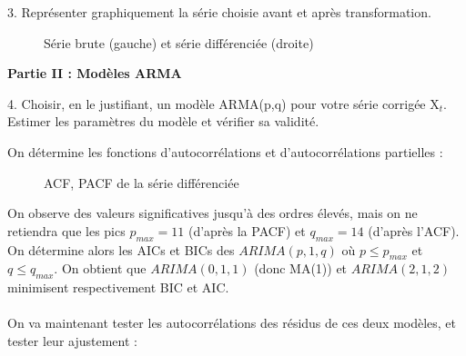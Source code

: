 \documentclass[a4paper, 12pt]{article} %
\begin{document}
\begin{tcolorbox}
{\small
3. Représenter graphiquement la série choisie avant et après transformation.
}
\end{tcolorbox}
\begin{figure}[h]
    \centering
    \caption{Série brute (gauche) et série différenciée (droite)}
\end{figure}
\Large{\textbf{Partie II : Modèles ARMA}}
\begin{tcolorbox}
{\small
4. Choisir, en le justifiant, un modèle ARMA(p,q) pour votre série corrigée X$_t$. Estimer les paramètres
du modèle et vérifier sa validité.
}
\end{tcolorbox}
{\normalsize
{On détermine les fonctions d'autocorrélations et d'autocorrélations partielles :
}}
\begin{figure}[h]
    \centering
    \caption{ACF, PACF de la série différenciée}
\end{figure}
\newpage
\normalsize{
{On observe des valeurs significatives jusqu'à des ordres élevés, mais on ne retiendra que les pics $p_{max} = 11$ (d'après la PACF) et $q_{max} = 14$ (d'après l'ACF).\\
On détermine alors les AICs et BICs des $ARIMA(p, 1, q)$ où $p \leqslant p_{max}$ et $q \leqslant q_{max}$. On obtient que $ARIMA(0, 1, 1)$ (donc MA(1)) et $ARIMA(2, 1, 2)$ minimisent respectivement BIC et AIC.\\ \\On va maintenant tester les autocorrélations des résidus de ces deux modèles, et tester leur ajustement :
}}
\end{document}
